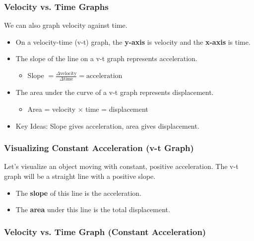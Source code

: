 \documentclass{beamer}
\begin{document}
\begin{frame}
\frametitle{Velocity vs. Time Graphs}
We can also graph velocity against time.
\pause
\begin{itemize}
    \item On a velocity-time (v-t) graph, the \textbf{y-axis} is velocity and the \textbf{x-axis} is time.
    \pause
    \item The \alert{slope} of the line on a v-t graph represents \alert{acceleration}.
    \pause
    \begin{itemize}
        \item Slope $= \frac{\Delta \text{velocity}}{\Delta \text{time}} = \text{acceleration}$
    \end{itemize}
    \pause
    \item The \alert{area under the curve} of a v-t graph represents \alert{displacement}.
    \pause
    \begin{itemize}
        \item Area = velocity $\times$ time = displacement
    \end{itemize}
    \pause
    \item \alert{Key Ideas:} Slope gives acceleration, area gives displacement.
\end{itemize}
\end{frame}

\begin{frame}
\frametitle{Visualizing Constant Acceleration (v-t Graph)}
Let's visualize an object moving with constant, positive acceleration. The v-t graph will be a straight line with a positive slope.
\begin{itemize}
    \item The \textbf{slope} of this line is the acceleration.
    \item The \textbf{area} under this line is the total displacement.
\end{itemize}
\end{frame}

\begin{frame}
\frametitle{Velocity vs. Time Graph (Constant Acceleration)}
\begin{figure}
\end{figure}
\end{frame}
\end{document}
